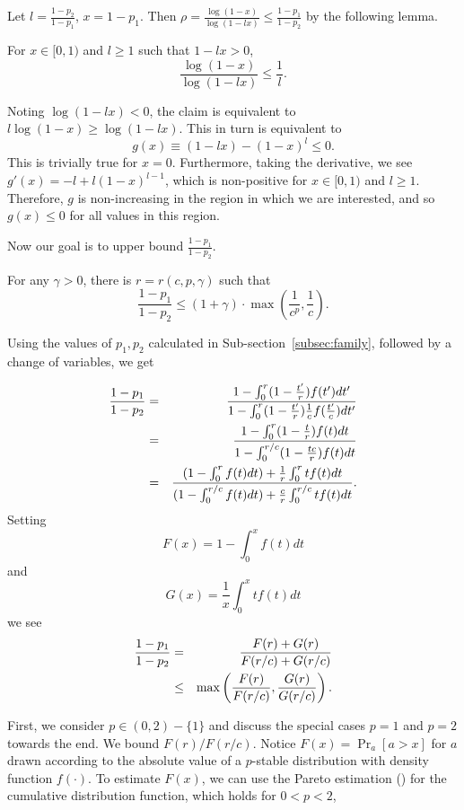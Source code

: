 \documentclass[12pt]{article}
\begin{document}
Let $l=\frac{1-p_2}{1-p_1}$, $x=1-p_1$.  Then
$\rho=\frac{\log(1-x)}{\log(1-lx)}\leq\frac{1-p_1}{1-p_2}$ by the
following lemma.

\begin{lemma}
For $x\in[0,1)$ and $l\geq 1$ such that $1 - lx > 0$,
$$\frac{\log(1-x)}{\log(1-lx)}\leq\frac{1}{l}.$$
\end{lemma}

 Noting $\log (1-lx) < 0$, the claim is equivalent to
$l\log(1-x)\geq\log(1-lx)$.
This in turn is equivalent to
$$g(x)\equiv(1-lx)-(1-x)^l\leq0.$$
This is trivially true for $x=0$.  Furthermore, taking the derivative, we see
$g'(x)=-l+l(1-x)^{l-1}$, which is non-positive for $x\in[0,1)$ and $l\geq1$.
Therefore, $g$ is non-increasing in the region in which we are interested,
and so $g(x)\leq0$ for all values in this region.


Now our goal is to upper bound $\frac{1-p_1}{1-p_2}$.

\begin{lemma}
\label{lemma:general_p}
For any $\gamma >0$, there is $r=r(c,p,\gamma)$ such that
$$\frac{1-p_1}{1-p_2} \le (1+\gamma)\cdot\max\left(\frac{1}{c^p}, \frac{1}{c}\right).$$
\end{lemma}

 Using the values of $p_1, p_2$ calculated in
Sub-section~\ref{subsec:family}, followed by a change of variables, we get

\begin{eqnarray*}
\frac{1-p_1}{1-p_2}
&=&
\frac{1-\int_0^r(1-\frac{t'}{r})f(t')dt'}
     {1-\int_0^r(1-\frac{t'}{r})\frac{1}{c}f(\frac{t'}{c})dt'}
\cr&=&
\frac{1-\int_0^r(1-\frac{t}{r})f(t)dt}
     {1-\int_0^{r/c}(1-\frac{tc}{r})f(t)dt}
\cr&=&
\frac{(1-\int_0^rf(t)dt)+\frac{1}{r}\int_0^rtf(t)dt}
     {(1-\int_0^{r/c}f(t)dt)+\frac{c}{r}\int_0^{r/c}tf(t)dt}.
\end{eqnarray*}
Setting
$$F(x)=1-\int_0^xf(t)dt$$
and
$$G(x)=\frac{1}{x}\int_0^xtf(t)dt$$
we see
\begin{eqnarray*}
\frac{1-p_1}{1-p_2} 
&=& \frac{F(r)+G(r)}{F(r/c)+G(r/c)}\cr
&\leq& \max\left(\frac{F(r)}{F(r/c)},\frac{G(r)}{G(r/c)}\right).
\end{eqnarray*}

First, we consider $p \in (0,2)-\{1\}$ and discuss the special
cases $p=1$ and $p=2$ towards the end.
We bound $F(r)/F(r/c)$.  Notice $F(x)=\Pr_a[a>x]$ for $a$
drawn according to the absolute value of
a $p$-stable distribution with density function
$f(\cdot)$.  To estimate $F(x)$, we can use the Pareto estimation
(\cite{Nol}) for the cumulative distribution function, which holds for $0
< p < 2$,
\end{document}
